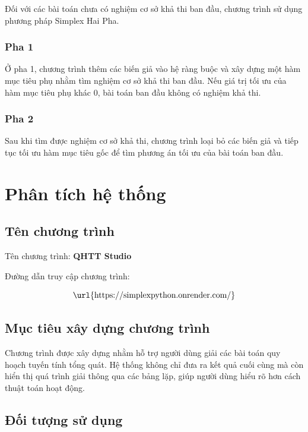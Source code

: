 \documentclass[14pt, a4paper]{extarticle}
\begin{document}
    Đối với các bài toán chưa có nghiệm cơ sở khả thi ban đầu, chương trình sử dụng phương pháp Simplex Hai Pha.
    
    \subsubsection{Pha 1}
    
    Ở pha 1, chương trình thêm các biến giả vào hệ ràng buộc và xây dựng một hàm mục tiêu phụ nhằm tìm nghiệm cơ sở khả thi ban đầu. Nếu giá trị tối ưu của hàm mục tiêu phụ khác 0, bài toán ban đầu không có nghiệm khả thi.
    
    \subsubsection{Pha 2}
    
    Sau khi tìm được nghiệm cơ sở khả thi, chương trình loại bỏ các biến giả và tiếp tục tối ưu hàm mục tiêu gốc để tìm phương án tối ưu của bài toán ban đầu.
    
    \section{Phân tích hệ thống}
    
    \subsection{Tên chương trình}
    
    Tên chương trình: \textbf{QHTT Studio}
    
    Đường dẫn truy cập chương trình:
    
    \[
    \text{\url{https://simplexpython.onrender.com/}}
    \]
    
    \subsection{Mục tiêu xây dựng chương trình}
    
    Chương trình được xây dựng nhằm hỗ trợ người dùng giải các bài toán quy hoạch tuyến tính tổng quát. Hệ thống không chỉ đưa ra kết quả cuối cùng mà còn hiển thị quá trình giải thông qua các bảng lặp, giúp người dùng hiểu rõ hơn cách thuật toán hoạt động.
    
    \subsection{Đối tượng sử dụng}
    
\end{document}
